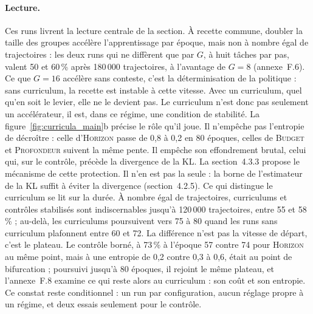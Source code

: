 \documentclass[11pt,a4paper]{article}
\begin{document}
\paragraph{Lecture.} Ces runs livrent la lecture centrale de la section. À recette commune, doubler la taille des groupes accélère l'apprentissage par époque, mais non à nombre égal de trajectoires : les deux runs qui ne diffèrent que par $G$, à huit tâches par pas, valent 50 et 60\,\% après 180\,000 trajectoires, à l'avantage de $G=8$ (annexe~F.6). Ce que $G=16$ accélère sans conteste, c'est la déterminisation de la politique : sans curriculum, la recette est instable à cette vitesse. Avec un curriculum, quel qu'en soit le levier, elle ne le devient pas. Le curriculum n'est donc pas seulement un accélérateur, il est, dans ce régime, une condition de stabilité. La figure~\ref{fig:curricula_main}b précise le rôle qu'il joue. Il n'empêche pas l'entropie de décroître : celle d'\textsc{Horizon} passe de 0{,}8 à 0{,}2 en 80 époques, celles de \textsc{Budget} et \textsc{Profondeur} suivent la même pente. Il empêche son effondrement brutal, celui qui, sur le contrôle, précède la divergence de la KL. La section~4.3.3 propose le mécanisme de cette protection. Il n'en est pas la seule : la borne de l'estimateur de la KL suffit à éviter la divergence (section~4.2.5). Ce qui distingue le curriculum se lit sur la durée. À nombre égal de trajectoires, curriculums et contrôles stabilisés sont indiscernables jusqu'à 120\,000 trajectoires, entre 55 et 58\,\% ; au-delà, les curriculums poursuivent vers 75 à 80 quand les runs sans curriculum plafonnent entre 60 et 72. La différence n'est pas la vitesse de départ, c'est le plateau. Le contrôle borné, à 73\,\% à l'époque 57 contre 74 pour \textsc{Horizon} au même point, mais à une entropie de 0{,}2 contre 0{,}3 à 0{,}6, était au point de bifurcation ; poursuivi jusqu'à 80 époques, il rejoint le même plateau, et l'annexe~F.8 examine ce qui reste alors au curriculum : son coût et son entropie. Ce constat reste conditionnel : un run par configuration, aucun réglage propre à un régime, et deux essais seulement pour le contrôle.
\end{document}
